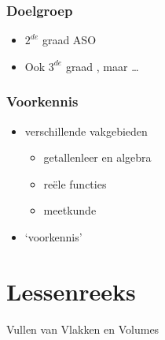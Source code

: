 \documentclass[dutch]{beamer}
\begin{document}

\begin{frame}
\frametitle{Doelgroep}
\pause
\begin{itemize}
\item $2^{de}$ graad ASO
\pause
\item Ook $3^{de}$ graad \pause, maar \ldots
\end{itemize}
\end{frame}


\begin{frame}
\frametitle{Voorkennis}
\pause
\begin{itemize}
\item verschillende vakgebieden
\pause
\begin{itemize}
\item getallenleer en algebra
\item re\"{e}le functies
\item meetkunde
\end{itemize}
\pause
\item `voorkennis'
\end{itemize}
\end{frame}

\section{Lessenreeks}

\begin{frame}
\begin{block}{
\begin{center}
\Large{Vullen van Vlakken en Volumes}
\end{center}}
\end{block}
\end{frame}
\end{document}
